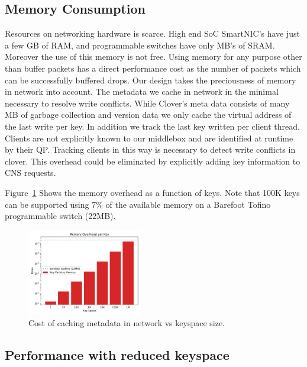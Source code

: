 \subsection{Memory Consumption}

Resources on networking hardware is scarce. High end SoC SmartNIC's
have just a few GB of RAM, and programmable switches have only MB's of
SRAM. Moreover the use of this memory is not free. Using memory for
any purpose other than buffer packets has a direct performance cost as
the number of packets which can be successfully buffered drops. Our
design takes the preciousness of memory in network into account. The
metadata we cache in network in the minimal necessary to resolve write
conflicts. While Clover's meta data consists of many MB of garbage
collection and version data we only cache the virtual address of the
last write per key. In addition we track the last key written per
client thread. Clients are not explicitly known to our middlebox and
are identified at runtime by their QP. Tracking clients in this way is
necessary to detect write conflicts in clover. This overhead could be
eliminated by explicitly adding key information to CNS requests.

Figure~\ref{fig:memory} Shows the memory overhead as a function of
keys. Note that 100K keys can be supported using 7\% of the available
memory on a Barefoot Tofino programmable switch (22MB).

\begin{figure}
    \includegraphics[width=0.45\textwidth]{fig/memory.pdf}
    \caption{Cost of caching metadata in network vs keyspace size.}
    \label{fig:memory}
\end{figure}

\subsection{Performance with reduced keyspace}









